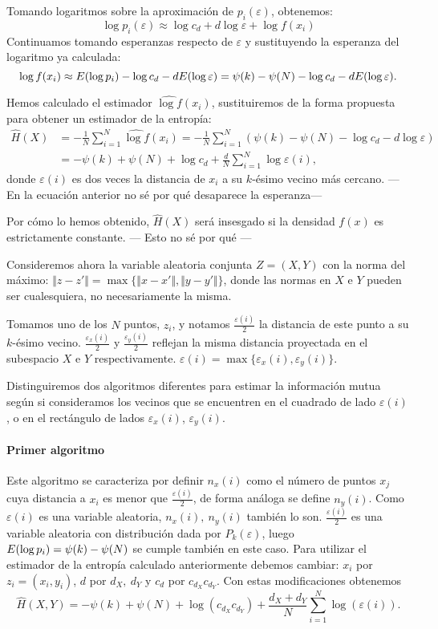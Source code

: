 \documentclass[10pt,a4paper]{article} %
\let\mathbb\relax
\theoremstyle{definition}
\begin{document}
Tomando logaritmos sobre la aproximación de $p_i(\varepsilon)$, obtenemos:\[
\log p_i(\varepsilon) \approx \log c_d + d \log \varepsilon + \log f(x_i)
\]
Continuamos tomando esperanzas respecto de $\varepsilon$ y sustituyendo la esperanza del logaritmo ya calculada:\[
\log f(x_i) \approx \mathbb{E}(\log p_i) - \log c_d  - d \mathbb{E} (\log \varepsilon) = \psi (k) - \psi (N) - \log c_d  - d \mathbb{E} (\log \varepsilon).
\]

Hemos calculado el estimador $\widehat{\log f} (x_i)$, sustituiremos de la forma propuesta para obtener un estimador de la entropía:
\begin{align}
  \widehat{H}(X) &= - \frac{1}{N} \sum_{i=1}^N\widehat{\log f} (x_i) = - \frac{1}{N} \sum_{i=1}^N\left (\psi (k) - \psi (N) - \log c_d  - d\log \varepsilon \right ) \nonumber \\
  &= - \psi (k) + \psi (N) + \log c_d + \frac{d}{N} \sum_{i=1}^N \log \varepsilon (i), \label{eq:est_ent}
\end{align}
donde $\varepsilon(i)$ es dos veces la distancia de $x_i$ a su $k$-ésimo vecino más cercano.
---En la ecuación anterior no sé por qué desaparece la esperanza---


Por cómo lo hemos obtenido, $\widehat{H}(X)$ será insesgado si la densidad $f(x)$ es estrictamente constante. --- Esto no sé por qué ---

Consideremos ahora la variable aleatoria conjunta $Z=(X,Y)$ con la norma del máximo: $\Vert z - z' \Vert = \max \{\Vert x-x' \Vert, \Vert y-y'\Vert\}$, donde las normas en $X$ e $Y$ pueden ser cualesquiera, no necesariamente la misma.

Tomamos uno de los $N$ puntos, $z_i$, y notamos $\frac{\varepsilon(i)}{2}$ la distancia de este punto a su $k$-ésimo vecino. $\frac{\varepsilon_x(i)}{2}$ y $\frac{\varepsilon_y(i)}{2}$ reflejan la misma distancia proyectada en el subespacio $X$ e $Y$ respectivamente. $\varepsilon(i) = \max \{\varepsilon_x(i), \varepsilon_y(i)\}$.

Distinguiremos dos algoritmos diferentes para estimar la información mutua según si consideramos los vecinos que se encuentren en el cuadrado de lado $\varepsilon(i)$, o en el rectángulo de lados $\varepsilon_x(i)$, $\varepsilon_y(i)$. 

\paragraph{Primer algoritmo}

Este algoritmo se caracteriza por definir $n_x(i)$ como el número de puntos $x_j$ cuya distancia a $x_i$ es menor que $\frac{\varepsilon(i)}{2}$, de forma análoga se define $n_y(i)$. Como $\varepsilon(i)$ es una variable aleatoria, $n_x(i),\ n_y(i)$ también lo son. $\frac{\varepsilon(i)}{2}$ es una variable aleatoria con distribución dada por $P_k(\varepsilon)$, luego $\mathbb{E}(\log p_i) = \psi(k) - \psi(N)$ se cumple también en este caso. Para utilizar el estimador de la entropía calculado anteriormente debemos cambiar: $x_i$ por $z_i=(x_i,y_i)$, $d$ por $d_X,\ d_Y$ y $c_d$ por $c_{d_X}c_{d_Y}$. Con estas modificaciones obtenemos\[
\widehat{H}(X,Y) = - \psi(k) + \psi(N) + \log (c_{d_X}c_{d_Y}) + \frac{d_X+d_Y}{N} \sum_{i=1}^N\log(\varepsilon(i)).
\]
\end{document}
